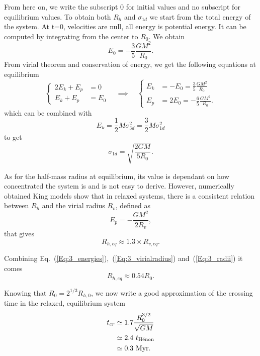 From here on, we write the subscript 0 for initial values and no subscript for equilibrium values. To obtain both $R_{h}$ and $\sigma_{1d}$ we start from the total energy of the system. At t=0, velocities are null, all energy is potential energy. It can be computed by integrating from the center to $R_0$. We obtain
\begin{equation}
E_0 = - \frac{3}{5} \frac{G M^2}{R_0}.
\end{equation}
From virial theorem and conservation of energy, we get the following equations at equilibrium
\begin{equation}
\label{Eq:3_energies}
\begin{cases}
2 E_k + E_p &=0\\
E_k + E_p &= E_0
\end{cases} 
\quad
\implies
\quad
\begin{cases}
E_k &= -E_0 = \frac{3}{5} \frac{G M^2}{R_0}\\
E_p &= 2 E_0 = - \frac{6}{5} \frac{G M^2}{R_0}.
\end{cases}
\end{equation}
which can be combined with
\begin{equation}
E_k = \frac{1}{2} M \sigma_{3d}^2 = \frac{3}{2} M \sigma_{1d}^2
\end{equation}
to get
\begin{equation}
\sigma_{1d} = \sqrt{\frac{2 G M}{5 R_0}}.
\end{equation}

As for the half-mass radius at equilibrium, its value is dependant on how concentrated the system is and is not easy to derive. However, numerically obtained King models show that in relaxed systems, there is a consistent relation between $R_h$ and the virial radius $R_v$, defined as 
\begin{equation}
\label{Eq:3_virialradius}
E_p = - \frac{G M^2}{2 R_v},
\end{equation}
that gives 
\begin{equation}
\label{Eq:3_radii}
R_{h,eq} \approx 1.3 \times R_{v,eq}.
\end{equation}

 Combining Eq.~(\ref{Eq:3_energies}),~(\ref{Eq:3_virialradius}) and~(\ref{Eq:3_radii})  it comes
\begin{equation}
R_{h,eq} \approx 0.54 R_0.
\end{equation}


Knowing that $R_0 = 2^{1/3} R_{h,0}$, we now write a good approximation of the crossing time in the relaxed, equilibrium system
\begin{align}
t_{cr}  &\simeq 1.7\frac{R_0^{3/2}}{\sqrt{GM}}\\
        &\simeq 2.4~ t_{\textrm{H\'enon}}\\
	    &\simeq 0.3~ {\textrm{Myr}}.
\end{align}

